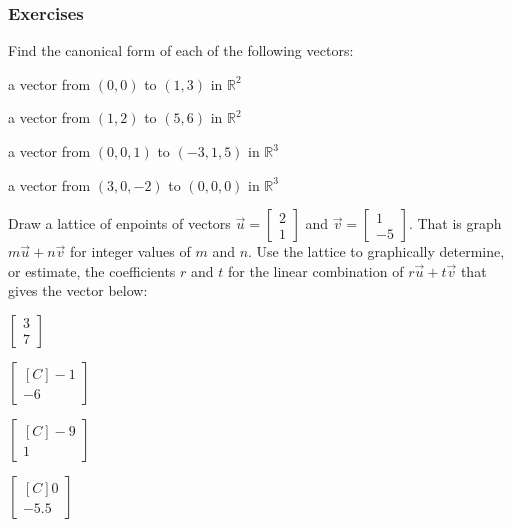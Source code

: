 \subsubsection{Exercises}

\begin{exercise} Find the canonical form of each of the following vectors:\\
\begin{inparaenum}[a)]
\item a vector from $(0,0)$ to $(1,3)$ in $\mathbb{R}^2$\\
\item a vector from $(1,2)$ to $(5,6)$ in $\mathbb{R}^2$\\
\item a vector from $(0,0,1)$ to $(-3,1,5)$ in $\mathbb{R}^3$\\
\item a vector from $(3,0,-2)$ to $(0,0,0)$ in $\mathbb{R}^3$\\
\end{inparaenum}
\end{exercise}

\begin{exercise} Draw a lattice of enpoints of vectors $\vec{u}=\begin{bmatrix}2\\1\end{bmatrix}$ and $\vec{v}=\begin{bmatrix}1\\-5\end{bmatrix}$. That is graph 
$m\vec{u}+n\vec{v}$ for integer values of $m$ and $n$. Use the lattice to graphically determine, or estimate, the coefficients $r$ and $t$ for the linear combination of $r\vec{u}+t\vec{v}$ that gives the vector below:\\
\begin{inparaenum}
\item $\begin{bmatrix}3 \\ 7 \end{bmatrix}$\hfill 
\item $\begin{bmatrix*}[C]-1 \\ -6 \end{bmatrix*}$\hfill {} \\
\item $\begin{bmatrix*}[C]-9 \\ 1 \end{bmatrix*}$\hfill 
\item $\begin{bmatrix*}[C] 0 \\ -5.5 \end{bmatrix*}$\hfill {} \\
\end{inparaenum}
\end{exercise}
